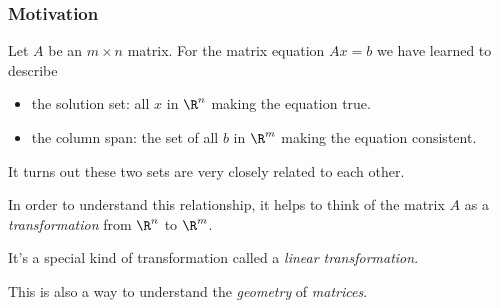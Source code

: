 


\usetikzlibrary{datavisualization.formats.functions}
\usetikzlibrary{decorations.pathreplacing}



\begin{frame}
\frametitle{Motivation}

Let $A$ be an $m\times n$ matrix.  
\pause
For the matrix equation $Ax=b$ we have
learned to describe 
\begin{itemize}
\pause
\item the solution set: all $x$ in $\R^n$ making the equation true.
\pause
\item the column span: the set of all $b$ in $\R^m$ making the equation
  consistent.
\end{itemize}

\pause\bigskip
It turns out these two sets are very closely related to each other.

\pause\bigskip
In order to understand this relationship, it helps to think of the matrix $A$ as
a \emph{transformation} from $\R^n$ to $\R^m$.

\pause\bigskip
It's a special kind of transformation called a \emph{linear transformation}.

\pause\bigskip
This is also a way to understand the \emph{geometry} of \emph{matrices}.

\end{frame}



